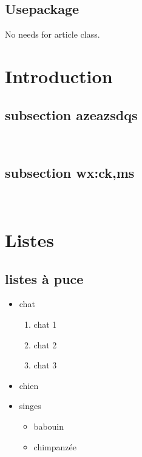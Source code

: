 \documentclass[a4paper,12pt]{article}
\begin{document}
\subsection{Usepackage}
No needs for article class.
\section{Introduction}


\subsection{subsection azeazsdqs}
\blindtext \\
\subsection{subsection wx:ck,ms}
\blindtext \\

\newpage
\section{Listes}
\subsection{listes à puce}

\renewcommand\labelitemi{X}

\begin{itemize}
  \item chat
  \begin{enumerate}
    \item chat 1
    \item chat 2
    \item chat 3
  \end{enumerate}
  \item chien
  \item singes
  \begin{itemize}
    \item babouin
    \item chimpanzée
  \end{itemize}
\end{itemize}
\end{document}
